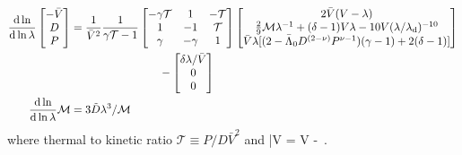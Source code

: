 \begin{align}
\label{eq:selfsim-sph_hydro-mat-gaso}
\begin{split}
\frac{{\rm d} \ln}{{\rm d} \ln \lambda}
\begin{bmatrix}
 -\bar{V}\\
 D\\
 P
\end{bmatrix} &= \frac{1}{\bar{V}^2} \frac{1}{\gamma \mathcal{T}-1}
\begin{bmatrix}
-\gamma \mathcal{T} & 1 & -\mathcal{T}\\
1 & -1 & \mathcal{T}\\
\gamma & -\gamma & 1
\end{bmatrix} \begin{bmatrix}
 2 \bar{V} (V-\lambda) \\
\frac{2}{9} \mathcal{M} \lambda^{-1} + (\delta -1 ) V \lambda - 10V(\lambda/\lambda_{\rm d})^{-10} \\
 \bar{V} \lambda [(2-\Bar{\Lambda}_0 D^{(2-\nu)} P^{\nu-1})(\gamma - 1) + 2(\delta -1)]
\end{bmatrix} \\
 &\qquad \qquad \qquad  \qquad  -\begin{bmatrix}
\delta \lambda/ \bar{V}\\
0\\
0\\
\end{bmatrix}\\
\frac{{\rm d} \ln}{{\rm d} \ln \lambda} \mathcal{M} &= 3 \tilde{D} \lambda^{3} /  \mathcal{M}
\end{split}
\end{align}
where thermal to kinetic ratio $\mathcal{T} \equiv P / D\bar{V}^2$ and 
\be
\bar{V} \equiv \frac{\der \lambda}{\der \xi} = V - \delta \lambda\,.
\label{eq:Vbar-def}
\ee



